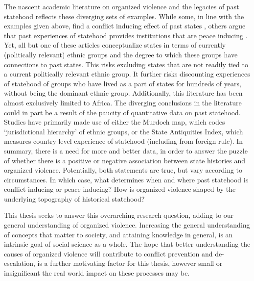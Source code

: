The nascent academic literature on organized violence and the legacies of past
statehood reflects these diverging sets of examples. While some, in line with
the examples given above, find a conflict inducing effect of past states
\citep{Englebert2002, Paine2019}, others argue that past experiences of
statehood provides institutions that are peace inducing \citep{Wig2016, Wig2018,
Depetris-Chauvin2016}. Yet, all but one of these articles conceptualize states
in terms of currently (politically relevant) ethnic groups and the degree to
which these groups have connections to past states. This risks excluding states
that are not readily tied to a current politically relevant ethnic group. It
further risks discounting experiences of statehood of groups who have lived as a
part of states for hundreds of years, without being the dominant ethnic group.
Additionally, this literature has been almost exclusively limited to Africa. The
diverging conclusions in the literature could in part be a result of the paucity
of quantitative data on past statehood. Studies have primarily made use of
either the Murdoch map, which codes `jurisdictional hierarchy' of ethnic groups,
or the State Antiquities Index, which measures country level experience of
statehood (including from foreign rule). In summary, there is a need for more
and better data, in order to answer the puzzle of whether there is a positive or
negative association between state histories and organized violence.
Potentially, both statements are true, but vary according to circumstances. In
which case, what determines when and where past statehood is conflict inducing
or peace inducing? How is organized violence shaped by the underlying topography
of historical statehood? 


This thesis seeks to answer this overarching research question, adding to our
general understanding of organized violence. Increasing the general
understanding of concepts that matter to society, and attaining knowledge in
general, is an intrinsic goal of social science as a whole. The hope that better
understanding the causes of organized violence will contribute to conflict
prevention and de-escalation, is a further motivating factor for this thesis,
however small or insignificant the real world impact on these processes may be.

